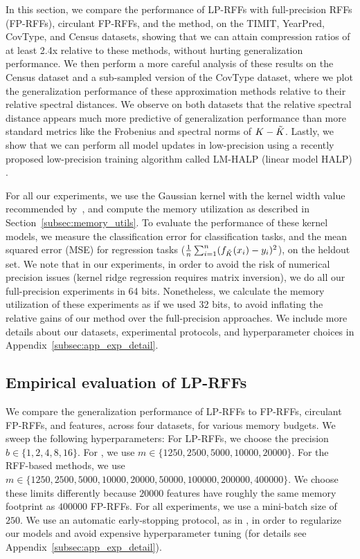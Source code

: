 In this section, we compare the performance of LP-RFFs with full-precision RFFs (FP-RFFs), circulant FP-RFFs, and the \Nystrom method, on the TIMIT, YearPred, CovType, and Census datasets, showing that we can attain compression ratios of at least 2.4x relative to these methods, without hurting generalization performance. We then perform a more careful analysis of these results on the Census dataset and a sub-sampled version of the CovType dataset, where we plot the generalization performance of these approximation methods relative to their relative spectral distances. We observe on both datasets that the relative spectral distance appears much more predictive of generalization performance than more standard metrics like the Frobenius and spectral norms of $K-\tilde{K}$. Lastly, we show that we can perform all model updates in low-precision using a recently proposed low-precision training algorithm called LM-HALP (linear model HALP) \citep{halp18}.

For all our experiments, we use the Gaussian kernel with the kernel width value recommended by~\citet{may2017}, and compute the memory utilization as described in Section~\ref{subsec:memory_utils}. To evaluate the performance of these kernel models, we measure the classification error for classification tasks, and the mean squared error (MSE) for regression tasks ($\frac{1}{n}\sum_{i=1}^n (f_{\tilde{K}}(x_i) - y_i)^2$), on the heldout set. We note that in our experiments, in order to avoid the risk of numerical precision issues (kernel ridge regression requires matrix inversion), we do all our full-precision experiments in 64 bits.  Nonetheless, we calculate the memory utilization of these experiments as if we used 32 bits, to avoid inflating the relative gains of our method over the full-precision approaches.  We include more details about our datasets, experimental protocols, and hyperparameter choices in Appendix~\ref{subsec:app_exp_detail}.

\subsection{Empirical evaluation of LP-RFFs}
\label{sec:full_run}
We compare the generalization performance of LP-RFFs to FP-RFFs, circulant FP-RFFs, and \Nystrom features, across four datasets, for various memory budgets.  We sweep the following hyperparameters: For LP-RFFs, we choose the precision $b \in \{1,2,4,8,16\}$. For \NystromNS, we use $m \in \{1250, 2500, 5000, 10000, 20000\}$.  For the RFF-based methods, we use $m\in \{1250, 2500, 5000, 10000, 20000, 50000, 100000, 200000, 400000\}$. We choose these limits differently because $\num[group-separator={,}]{20000}$ \Nystrom features have roughly the same memory footprint as $\num[group-separator={,}]{400000}$ FP-RFFs. For all experiments, we use a mini-batch size of $250$.  We use an automatic early-stopping protocol, as in \citep{morgan1990generalization,sainath2013b,sainath2013low}, in order to regularize our models \citep{zhang2005boosting,wei2017early} and avoid expensive hyperparameter tuning (for details see Appendix~\ref{subsec:app_exp_detail}).

